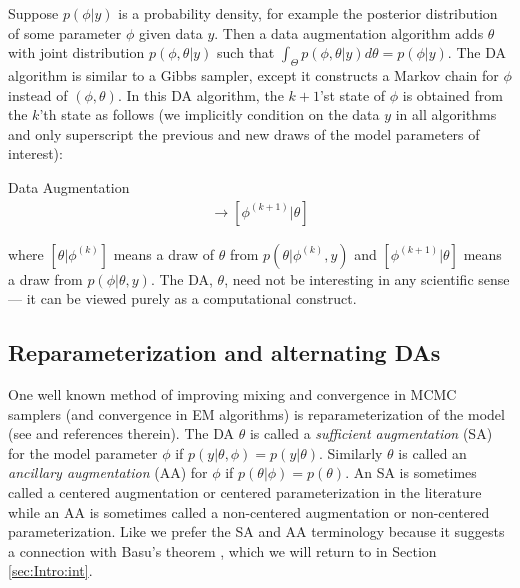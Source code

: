 \documentclass[12pt]{article}
\begin{document}
Suppose $p(\phi|y)$ is a probability density, for example the posterior distribution of some parameter $\phi$ given data $y$. %
Then a data augmentation algorithm adds $\theta$ with joint distribution $p(\phi,\theta|y)$ such that $\int_{\Theta}p(\phi,\theta|y)d\theta = p(\phi|y)$. The DA algorithm is similar to a Gibbs sampler, except it constructs a Markov chain for $\phi$ instead of $(\phi, \theta)$. In this DA algorithm, the $k+1$'st state of $\phi$ is obtained from the $k$'th state as follows (we implicitly condition on the data $y$ in all algorithms and only superscript the previous and new draws of the model parameters of interest):
\begin{alg*}[DA]Data Augmentation\label{alg:DA}
  \begin{align*}
  [\theta|\phi^{(k)}] \to [\phi^{(k+1)}|\theta]
\end{align*}
\end{alg*}
\noindent where $[\theta|\phi^{(k)}]$ means a draw of $\theta$ from $p(\theta|\phi^{(k)},y)$ and $[\phi^{(k+1)}|\theta]$ means a draw from $p(\phi|\theta,y)$. The DA, $\theta$, need not be interesting in any scientific sense --- it can be viewed purely as a computational construct. 

\subsection{Reparameterization and alternating DAs}

One well known method of improving mixing and convergence in MCMC samplers (and convergence in EM algorithms) is reparameterization of the model (see  \citet{papaspiliopoulos2007general} and references therein). The DA $\theta$ is called a {\it sufficient augmentation} (SA) for the model parameter $\phi$ if $p(y|\theta,\phi)=p(y|\theta)$. Similarly $\theta$ is called an {\it ancillary augmentation} (AA) for $\phi$ if $p(\theta|\phi)=p(\theta)$. An SA is sometimes called a centered augmentation or centered parameterization in the literature while an AA is sometimes called a non-centered augmentation or non-centered parameterization. Like \citet{yu2011center} we prefer the SA and AA terminology because it suggests a connection with Basu's theorem \citep{basu1955statistics}, which we will return to in Section \ref{sec:Intro:int}.
\end{document}
